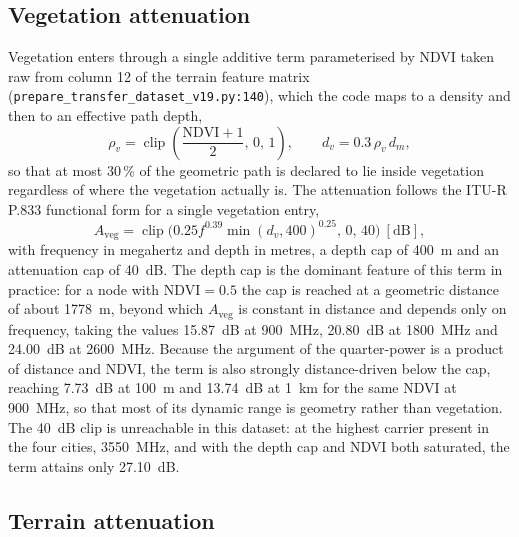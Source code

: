 \subsection{Vegetation attenuation}

Vegetation enters through a single additive term parameterised by NDVI
taken raw from column 12 of the terrain feature matrix
(\texttt{prepare\_\allowbreak{}transfer\_\allowbreak{}dataset\_\allowbreak{}v19.py:\allowbreak{}140}), which the code maps to a
density and then to an effective path depth,
\begin{equation}
\rho_{v} = \operatorname{clip}\!\left(\frac{\mathrm{NDVI}+1}{2},\,0,\,1\right),
\qquad
d_{v} = 0.3\, \rho_{v}\, d_{m} ,
\label{eq:app-vegdepth}
\end{equation}
so that at most 30\,\% of the geometric path is declared to lie inside
vegetation regardless of where the vegetation actually is. The attenuation
follows the ITU-R P.833 functional form for a single vegetation entry,
\begin{equation}
A_{\mathrm{veg}} = \operatorname{clip}\!\bigl(
0.25 f^{0.39} \min(d_{v}, 400)^{0.25},\, 0,\, 40 \bigr)\ [\mathrm{dB}] ,
\label{eq:app-aveg}
\end{equation}
with frequency in megahertz and depth in metres, a depth cap of 400~m and
an attenuation cap of 40~dB. The depth cap is the dominant feature of this
term in practice: for a node with $\mathrm{NDVI}=0.5$ the cap is reached at
a geometric distance of about 1778~m, beyond which $A_{\mathrm{veg}}$ is
constant in distance and depends only on frequency, taking the values
15.87~dB at 900~MHz, 20.80~dB at 1800~MHz and 24.00~dB at 2600~MHz.
Because the argument of the quarter-power is a product of distance and
NDVI, the term is also strongly distance-driven below the cap, reaching
7.73~dB at 100~m and 13.74~dB at 1~km for the same NDVI at 900~MHz, so that
most of its dynamic range is geometry rather than vegetation. The 40~dB
clip is unreachable in this dataset: at the highest carrier present in the
four cities, 3550~MHz, and with the depth cap and NDVI both saturated, the
term attains only 27.10~dB.

\subsection{Terrain attenuation}

